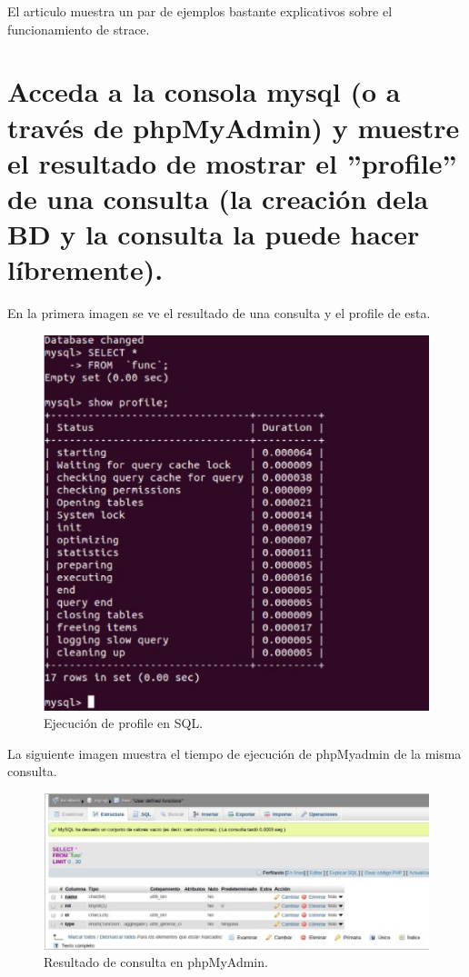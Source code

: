 El articulo muestra un par de ejemplos bastante explicativos sobre el funcionamiento de strace.




\section{Acceda a la consola mysql (o a través de phpMyAdmin) y muestre el resultado de mostrar el ”profile” de una consulta (la creación dela BD y la consulta la puede hacer líbremente).}

En la primera imagen se ve el resultado de una consulta y el profile de esta.

\begin{figure}[H]
\begin{center}
\includegraphics[scale=0.4]{imagenes/ejercicio9-1.eps}
\caption{Ejecución de profile en SQL.}
\end{center}
\end{figure}

La siguiente imagen muestra el tiempo de ejecución de phpMyadmin de la misma consulta.

\begin{figure}[H]
\begin{center}
\includegraphics[scale=0.4]{imagenes/ejercicio9-2.eps}
\caption{Resultado de consulta en phpMyAdmin.}
\end{center}
\end{figure}

